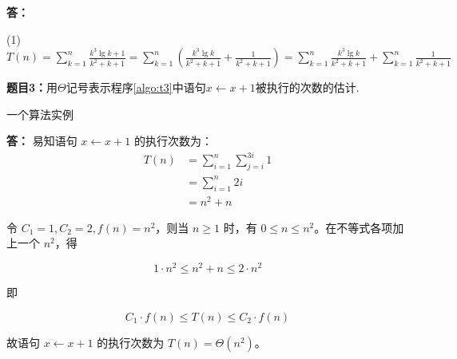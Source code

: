 \documentclass[12pt,a4paper]{ctexart}
\begin{document}
\vspace{5pt}
\noindent
{
  \textbf{答：}

  (1) $T(n)=\sum\limits_{k=1}^n\frac{k^3\lg k+1}{k^2+k+1} = \sum\limits_{k=1}^n(\frac{k^3\lg k}{k^2+k+1}+\frac{1}{k^2+k+1}) = \sum\limits_{k=1}^n\frac{k^3\lg k}{k^2+k+1}+\sum\limits_{k=1}^n\frac{1}{k^2+k+1}$
}


\vspace{10pt}
\noindent
{\bf 题目3：}用$\Theta$记号表示程序\ref{algo:t3}中语句$x \gets x+1$被执行的次数的估计.
\begin{algorithm}[h]
\caption{一个算法实例}
\label{algo:t3}
\end{algorithm}

\vspace{5pt}
\noindent
{
  \textbf{答：}
  易知语句 $x \gets x+1$ 的执行次数为：
  \begin{align*}
      T(n) &= \sum_{i=1}^{n} \sum_{j=i}^{3i} 1 \\
           &= \sum_{i=1}^{n} 2i \\
           &= n^2 + n
  \end{align*}

  令 $C_1 = 1, C_2 = 2, f(n) = n^2$，则当 $n \geq 1$ 时，有 $0 \leq n \leq n^2$。在不等式各项加上一个 $n^2$，得

  \[
    1 \cdot n^2 \leq n^2 + n \leq 2 \cdot n^2
  \]

  即

  \[
    C_1 \cdot f(n) \leq T(n) \leq C_2 \cdot f(n)
  \]

  故语句 $x \gets x+1$ 的执行次数为 $T(n) = \Theta(n^2)$。
}

\end{document}
